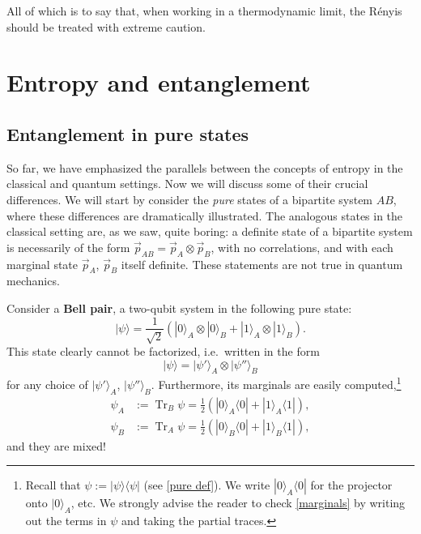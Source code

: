 \documentclass[11pt]{article}
\newcommand{\ket}[1]{|{#1}\rangle}
\newcommand{\bra}[1]{\langle{#1}|}
\DeclareMathOperator{\Tr}{Tr}
\begin{document}
All of which is to say that, when working in a thermodynamic limit, the R\'enyis should be treated with extreme caution. 



\section{Entropy and entanglement}
\label{sec:entropy and entanglement}


\subsection{Entanglement in pure states}\label{sec:entanglement}

So far, we have emphasized the parallels between the concepts of entropy in the classical and quantum settings. Now we will discuss some of their crucial differences. We will start by consider the \emph{pure} states of a bipartite system $AB$, where these differences are dramatically illustrated. The analogous states in the classical setting are, as we saw, quite boring: a definite state of a bipartite system is necessarily of the form $\vec p_{AB}=\vec p_A\otimes\vec p_B$, with no correlations, and with each marginal state $\vec p_A$, $\vec p_B$ itself definite. These statements are not true in quantum mechanics.

Consider a \textbf{Bell pair}, a two-qubit system in the following pure state:
\begin{equation}
\ket{\psi}=\frac1{\sqrt{2}}\left(\ket{0}_A\otimes\ket{0}_B+\ket{1}_A\otimes\ket{1}_B\right).
\end{equation}
This state clearly cannot be factorized, i.e.\ written in the form
\begin{equation}\label{factorized}
\ket{\psi}=\ket{\psi'}_A\otimes\ket{\psi''}_{B}
\end{equation}
for any choice of $\ket{\psi'}_A$, $\ket{\psi''}_B$. Furthermore, its marginals are easily computed,\footnote{Recall that $\psi:=\ket{\psi}\bra{\psi}$ (see \eqref{pure def}). We write $\ket{0}_A\bra{0}$ for the projector onto $\ket{0}_A$, etc. We strongly advise the reader to check \eqref{marginals} by writing out the terms in $\psi$ and taking the partial traces.}
\begin{align}\label{marginals}
\psi_A &:= \Tr_B\psi
=\frac12\left(\ket{0}_A\bra{0}+\ket{1}_A\bra{1}\right),\\
\psi_B &:=  \Tr_A\psi=\frac12\left(\ket{0}_B\bra{0}+\ket{1}_B\bra{1}\right),\nonumber
\end{align}
and they are mixed!
\end{document}
